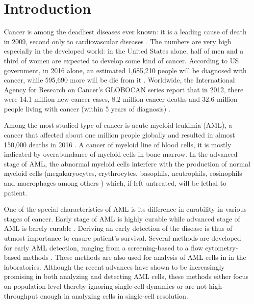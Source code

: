 \documentclass[pdftex,12pt,a4paper]{report}
\begin{document}
\tableofcontents

\newpage

\listoffigures

\newpage

\listoftables

\newpage

\chapter{Introduction}
\label{chapter:introduction}



Cancer is among the deadliest diseases ever known: it is a leading cause of death in 2009, second only to cardiovascular diseases \cite{sudhakar2009history}. The numbers are very high especially in the developed world: in the United States alone, half of men and a third of women are expected to develop some kind of cancer. According to US government, in 2016 alone, an estimated 1,685,210 people will be diagnosed with cancer, while 595,690 more will be die from it \cite{cancergov2017stat}. Worldwide, the International Agency for Research on Cancer's GLOBOCAN series report that in 2012, there were 14.1 million new cancer cases, 8.2 million cancer deaths and 32.6 million people living with cancer (within 5 years of diagnosis) \cite{ferlay2015cancer}.

Among the most studied type of cancer is acute myeloid leukimia (AML), a cancer that affected about one million people globally and resulted in almost 150,000 deaths in 2016 \cite{vos2016global}. A cancer of myeloid line of blood cells, it is mostly indicated by overabundance of myeloid cells in bone marrow. In the advanced stage of AML, the abnormal myeloid cells interfere with the production of normal myeloid cells \cite{nci2018aml} (megakaryocytes, erythrocytes, basophils, neutrophils, eosinophils and macrophages among others \cite{collins1977continuous}) which, if left untreated, will be lethal to patient.

One of the special characteristics of AML is its difference in curability in various stages of cancer. Early stage of AML is highly curable while advanced stage of AML is barely curable \cite{greaves1993stem}. Deriving an early detection of the disease is thus of utmost importance to ensure patient's survival. Several methods are developed for early AML detection, ranging from a screening-based \cite{cowen1973aml} to a flow cytometry-based methods \cite{terwijn2013high}. These methods are also used for analysis of AML cells in in the laboratories. Although the recent advances have shown to be increasingly promising in both analyzing and detecting AML cells, these methods either focus on population level thereby ignoring single-cell dynamics or are not high-throughput enough in analyzing cells in single-cell resolution.
\end{document}
